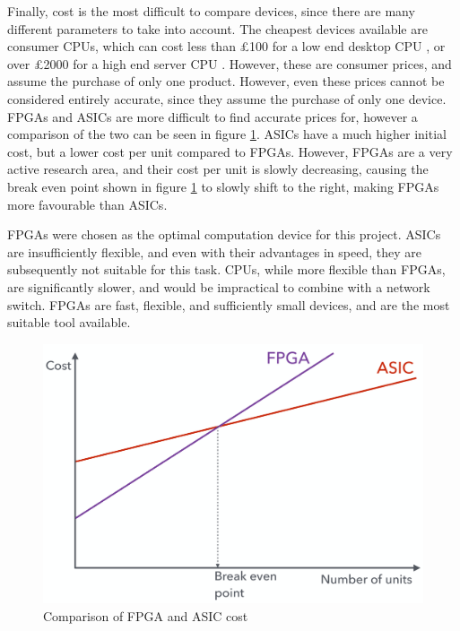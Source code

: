 Finally, cost is the most difficult to compare devices, since there are many different parameters to take into account. The cheapest devices available are consumer CPUs, which can cost less than £100 for a low end desktop CPU \cite{scan_celeron_g4900} \cite{intel_celeron_g4900}, or over £2000 for a high end server CPU \cite{scan_xeon_gold_6132} \cite{intel_xeon_gold_6132}.
However, these are consumer prices, and assume the purchase of only one product.
However, even these prices cannot be considered entirely accurate, since they assume the purchase of only one device.
FPGAs and ASICs are more difficult to find accurate prices for, however a comparison of the two can be seen in figure \ref{fpga_asic_cost_tradeoff}. ASICs have a much higher initial cost, but a lower cost per unit compared to FPGAs.
However, FPGAs are a very active research area, and their cost per unit is slowly decreasing, causing the break even point shown in figure \ref{fpga_asic_cost_tradeoff} to slowly shift to the right, making FPGAs more favourable than ASICs.

FPGAs were chosen as the optimal computation device for this project. ASICs are insufficiently flexible, and even with their advantages in speed, they are subsequently not suitable for this task. CPUs, while more flexible than FPGAs, are significantly slower, and would be impractical to combine with a network switch. FPGAs are fast, flexible, and sufficiently small devices, and are the most suitable tool available.

\begin{figure}[ht!]
  \centering
  \includegraphics[width=\textwidth]{assets/fpga_asic_cost_tradeoff.png}
  \caption{Comparison of FPGA and ASIC cost \cite{es3b2}}
  \label{fpga_asic_cost_tradeoff}
\end{figure}


